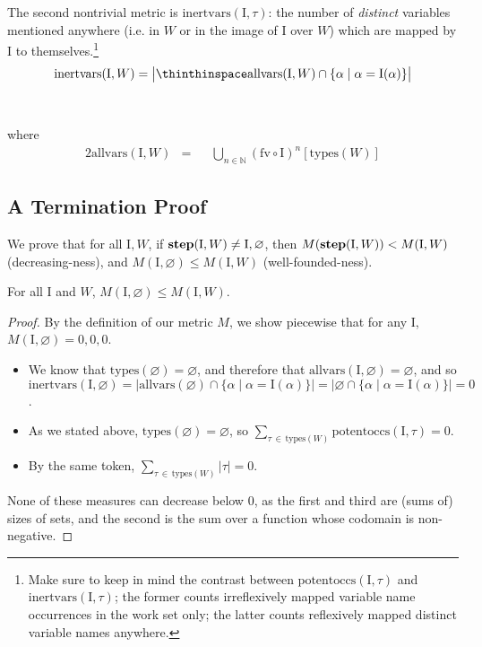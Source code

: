 \documentclass[10pt, letterpaper, oneside]{article}
\newcommand{\inertset}{\text{I}}
\newcommand{\fv}{\mathrm{fv}}
\begin{document}
The second nontrivial metric is \(\text{inertvars}(\inertset, \tau)\): the number of \emph{distinct} variables mentioned anywhere (i.e. in \(W\) or in the image of \(\inertset\) over \(W\)) which are mapped by \(\inertset\) to themselves.\footnote{Make sure to keep in mind the contrast between \(\text{potentoccs}(\inertset, \tau)\) and \(\text{inertvars}(\inertset, \tau)\); the former counts irreflexively mapped variable name occurrences in the work set only; the latter counts reflexively mapped distinct variable names anywhere.}
\begin{align*}
  \text{inertvars}(\inertset, W) = \big|\thinthinspace\text{allvars}(\inertset, W) \cap \{\alpha \mid \alpha = \inertset(\alpha)\}\big|
\end{align*}\\\vspace{-2\baselineskip}\\
where\vspace{-.5\baselineskip}
\begin{alignat*}{2}
  \text{allvars}(\inertset, W) &= &&\bigcup_{n \in \mathbb{N}} (\fv \circ \inertset)^n[\text{types}(W)]
\end{alignat*}

\newpage

\subsection{A Termination Proof}

We prove that for all \(\inertset, W\), if \(\text{\bf step}(\inertset, W) \ne \inertset, \varnothing\), then \(M(\text{\bf step}(\inertset, W)) < M(\inertset, W)\) (decreasing-ness), and \(M(\inertset, \varnothing) \le M(\inertset, W)\) (well-founded-ness).

\begin{theorem}
  \label{theorem:well-founded-step}
  For all  \(\inertset\) and \(W\!\),  \(M(\inertset, \varnothing) \le M(\inertset, W)\).
\end{theorem}

\begin{proof}
  By the definition of our metric \(M\), we show piecewise that for any \(\inertset\),  \(M(\inertset, \varnothing) = 0, 0, 0\).
  \begin{itemize}
    \item We know that \(\text{types}(\varnothing) = \varnothing\), and therefore that \(\text{allvars}(\inertset, \varnothing) = \varnothing\), and so \(\text{inertvars}(\inertset, \varnothing) = |\text{allvars}(\varnothing) \cap \{\alpha \mid \alpha = \inertset(\alpha)\}| = |\varnothing \cap \{\alpha \mid \alpha = \inertset(\alpha)\}| = 0\).
    \item As we stated above, \(\text{types}(\varnothing) = \varnothing\), so \(\sum_{\tau\,\in\,\text{types}(W)}\text{potentoccs}(\inertset, \tau) = 0\).
    \item By the same token, \(\sum_{\tau\,\in\,\text{types}(W)}|\tau| = 0\).
  \end{itemize}
  None of these measures can decrease below 0, as the first and third are (sums of) sizes of sets, and the second is the sum over a function whose codomain is non-negative.
\end{proof}
\end{document}
